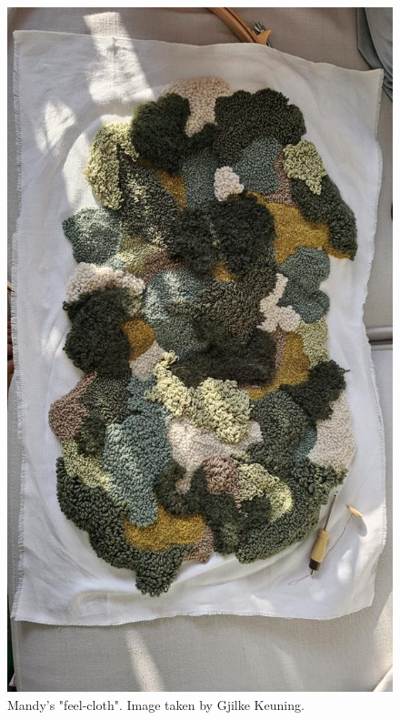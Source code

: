 \documentclass[authordate, empirical]{jote-new-article}
\begin{document}
	\begin{figure}
		\includegraphics[width=\linewidth]{media/fig+3.jpeg}

		\caption{Mandy's "feel-cloth". Image taken by Gjilke Keuning.}



	\end{figure}
\end{document}
